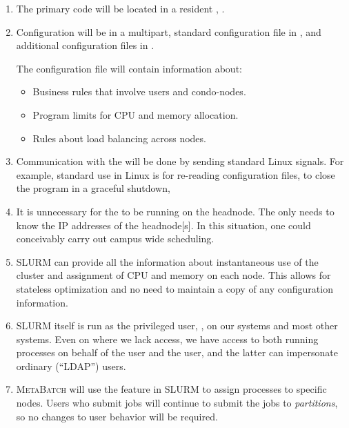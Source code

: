 \documentclass[11pt,letterpaper,portrait]{article}
\providecommand{\MB}{{\fontfamily{pzc}\selectfont \Large M\textsc{eta}B\textsc{atch}}\xspace}
\begin{document}
\begin{enumerate}
\item The primary code will be located in a resident \daemon,
.

\item Configuration will be in a multipart, standard configuration
file in , and additional configuration
files in . 

The configuration file will contain information about:

\begin{itemize}
\item Business rules that involve users and condo-nodes.
\item Program limits for CPU and memory allocation.
\item Rules about load balancing across nodes.
\end{itemize}

\item Communication with the \daemon will be done by sending 
standard Linux signals. For example, standard use in Linux is
 for re-reading configuration files,  
to close the program in a graceful shutdown, \etc

\item It is unnecessary for the \daemon to be running on the headnode.
The \daemon only needs to know the IP addresses of the headnode[s]. 
In this situation, one \daemon could conceivably carry out campus
wide scheduling. 

\item SLURM can provide all the information about instantaneous use
of the cluster and assignment of CPU and memory on each node. This 
allows for stateless optimization and no need to maintain a copy of
any configuration information.

\item SLURM itself is run as the privileged user, , on
our systems and most other systems. Even on \spydur where we lack
 access, we have access to both running processes on 
behalf of the  user and the  user, and
the latter can impersonate ordinary (``LDAP'') users.

\item \MB will use the feature in SLURM to assign processes to 
specific nodes. Users who submit jobs will continue to submit
the jobs to \emph{partitions}, so no changes to user behavior
will be required. 

\end{enumerate}

\EOD

\URfooter
\end{document}
